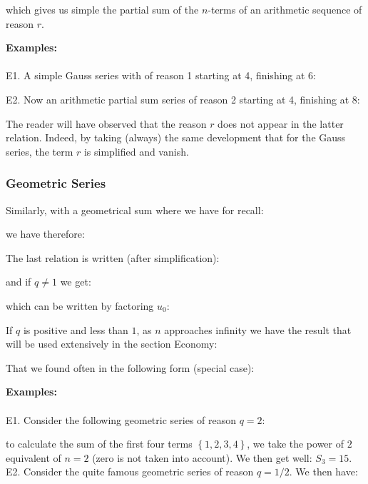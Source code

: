 	which gives us simple the partial sum of the $n$-terms of an arithmetic sequence of reason $r$.
	\begin{tcolorbox}[colframe=black,colback=white,sharp corners]
	\textbf{{\Large {}}Examples:}\\\\
	E1. A simple Gauss series with of reason 1 starting at 4, finishing at 6:
	
	E2. Now an arithmetic partial sum series of reason 2 starting at 4, finishing at 8:
	
	\end{tcolorbox}
	\begin{tcolorbox}[title=Remark,colframe=black,arc=10pt]
	The reader will have observed that the reason $r$ does not appear in the latter relation. Indeed, by taking (always) the same development that for the Gauss series, the term $r$ is simplified and vanish.
	\end{tcolorbox}
	
	\subsubsection{Geometric Series}\label{geometric series}
	Similarly, with a geometrical sum where we have for recall:
	
	we have therefore:
	
	The last relation is written (after simplification):
	
	and if $q\neq 1$ we get:
	
	which can be written by factoring $u_0$:
	
	If $q$ is positive and less than $1$, as $n$ approaches infinity we have the result that will be used extensively in the section Economy:
	
	That we found often in the following form (special case):
	
	
	\begin{tcolorbox}[colframe=black,colback=white,sharp corners]
	\textbf{{\Large {}}Examples:}\\\\
	E1. Consider the following geometric series of reason $q = 2$:
	
	to calculate the sum of the first four terms $\left\lbrace 1,2,3,4 \right\rbrace$, we take the power of $2$ equivalent of $n=2$ (zero is not taken into account). We then get well: $S_3=15$.\\
	
	E2. Consider the quite famous geometric series of reason $q=1/2$. We then have:
	
	\end{tcolorbox}
	
